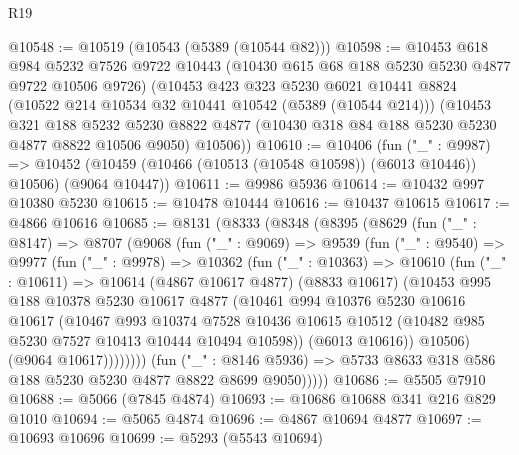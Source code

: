 \begin{lexlean}{R19}
\begin{coremodule}
@10548 := @10519 (@10543 (@5389 (@10544 @82)))
@10598 := @10453
    @618
    @984
    @5232
    @7526
    @9722
    @10443
    (@10430 @615 @68 @188 @5230 @5230 @4877 @9722 @10506 @9726)
    (@10453
      @423
      @323
      @5230
      @6021
      @10441
      @8824
      (@10522 @214 @10534 @32 @10441 @10542 (@5389 (@10544 @214)))
      (@10453
        @321
        @188
        @5232
        @5230
        @8822
        @4877
        (@10430 @318 @84 @188 @5230 @5230 @4877 @8822 @10506 @9050)
        @10506))
@10610 := @10406
    (fun ("_" : @9987) =>
    @10452 (@10459 (@10466 (@10513 (@10548 @10598)) (@6013 @10446)) @10506) (@9064 @10447))
@10611 := @9986 @5936
@10614 := @10432 @997 @10380 @5230
@10615 := @10478 @10444
@10616 := @10437 @10615
@10617 := @4866 @10616
@10685 := @8131
    (@8333
      (@8348
        (@8395
          (@8629
            (fun ("_" : @8147) =>
            @8707
              (@9068
                (fun ("_" : @9069) =>
                @9539
                  (fun ("_" : @9540) =>
                  @9977
                    (fun ("_" : @9978) =>
                    @10362
                      (fun ("_" : @10363) =>
                      @10610
                        (fun ("_" : @10611) =>
                        @10614
                          (@4867 @10617 @4877)
                          (@8833 @10617)
                          (@10453
                            @995
                            @188
                            @10378
                            @5230
                            @10617
                            @4877
                            (@10461
                              @994
                              @10376
                              @5230
                              @10616
                              @10617
                              (@10467
                                @993
                                @10374
                                @7528
                                @10436
                                @10615
                                @10512
                                (@10482 @985 @5230 @7527 @10413 @10444 @10494 @10598))
                              (@6013 @10616))
                            @10506)
                          (@9064 @10617))))))))
            (fun ("_" : @8146 @5936) =>
            @5733 @8633 @318 @586 @188 @5230 @5230 @4877 @8822 @8699 @9050)))))
@10686 := @5505 @7910
@10688 := @5066 (@7845 @4874)
@10693 := @10686 @10688 @341 @216 @829 @1010
@10694 := @5065 @4874
@10696 := @4867 @10694 @4877
@10697 := @10693 @10696
@10699 := @5293 (@5543 @10694)

\end{coremodule}
\end{lexlean}
